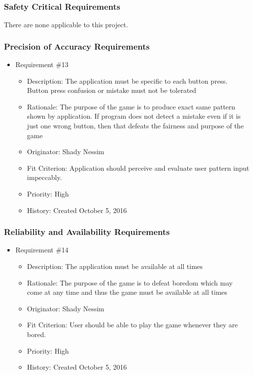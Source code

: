 \documentclass[12pt, titlepage]{article}
\begin{document}
\subsubsection{Safety Critical Requirements}
There are none applicable to this project.

\subsubsection{Precision of Accuracy Requirements}
\begin{itemize}

\item Requirement \#13 
\begin{itemize} 
\item Description: The application must be specific to each button press. Button press confusion or mistake must not be tolerated
\item Rationale: The purpose of the game is to produce exact same pattern shown by application. If program does not detect a mistake even if it is just one wrong button, then that defeats the fairness and purpose of the game
\item Originator: Shady Nessim 
\item Fit Criterion: Application should perceive and evaluate user pattern input impeccably.
\item Priority: High 
\item History: Created October 5, 2016
\end{itemize}

\end{itemize}

\subsubsection{Reliability and Availability Requirements}
\begin{itemize} 

\item Requirement \#14 
\begin{itemize} 
\item Description: The application must be available at all times
\item Rationale: The purpose of the game is to defeat boredom which may come at any time and thus the game must be available at all times
\item Originator: Shady Nessim 
\item Fit Criterion: User should be able to play the game whenever they are bored.
\item Priority: High 
\item History: Created October 5, 2016
\end{itemize}

\end{itemize}
\end{document}
